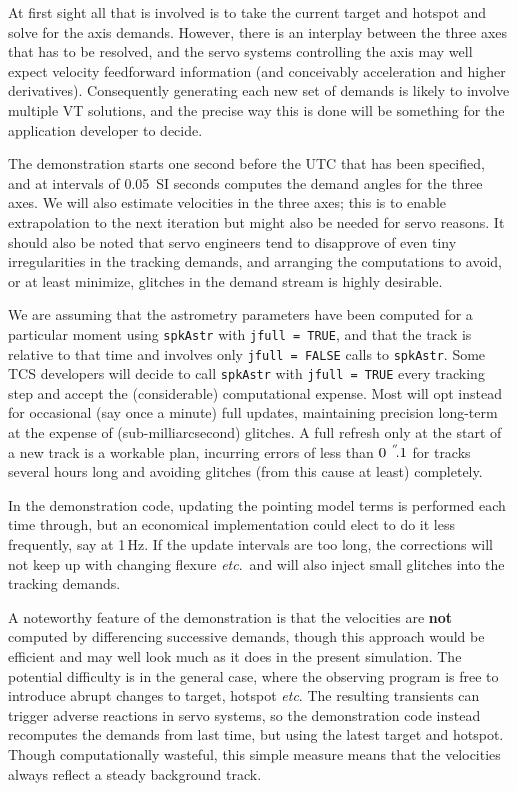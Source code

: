 \documentclass[11pt,fleqn,twoside,\paper]{article}
\renewcommand{\_}{{\tt\char'137}}     %
\newcommand{\arcseci}[1] {$#1\hspace{0.05em}$\raisebox{-0.5ex}
                         {$^{'\hspace{-0.1em}'\hspace{0.0em}}$}}
\newcommand{\arcsec}[2] {\arcseci{#1}$\hspace{-0.35em}.#2$}
\begin{document}
At first sight all that is
involved is to take the current target and hotspot
and solve for the axis demands.
However, there is an interplay between the three axes that has to be
resolved, and the servo systems controlling the axis may well expect
velocity feedforward information (and conceivably acceleration and
higher derivatives).  Consequently generating each new set of
demands is likely to involve multiple VT solutions, and the precise
way this is done will be something for the application developer to
decide.

The demonstration starts one second before the UTC that has
been specified, and at intervals of 0.05~SI seconds computes the
demand angles for the three axes.  We will also estimate velocities
in the three axes;  this is to enable extrapolation to the next
iteration but might also be needed for servo reasons.  It should also
be noted that servo engineers tend to disapprove of even tiny
irregularities in the tracking demands, and arranging the
computations to avoid, or at least minimize, glitches in the
demand stream is highly desirable.

We are assuming that the astrometry parameters have
been computed for a particular moment using {\tt spkAstr} with
{\tt jfull~=~TRUE}, and that the track is relative to that time and
involves only {\tt jfull~=~FALSE} calls to {\tt spkAstr}.
Some TCS developers will decide to call {\tt spkAstr} with
{\tt jfull~=~TRUE} every tracking step and accept the
(considerable)
computational expense.  Most will opt instead for
occasional (say once a minute) full updates, maintaining
precision long-term at the expense of (sub-milliarcsecond)
glitches.  A full refresh only at the start of a new track
is a workable plan, incurring errors of less than
\arcsec{0}{1} for tracks several hours long and avoiding
glitches (from this cause at least) completely.

In the demonstration code, updating the pointing model terms is
performed each time through, but an economical implementation
could elect to do it less frequently, say at 1\,Hz.  If
the update intervals are too long, the corrections will not keep
up with changing flexure {\it etc}.~and will also inject small
glitches into the tracking demands.

A noteworthy feature of the demonstration is that the velocities
are {\bf not} computed by differencing successive demands, though
this approach would be efficient and may well look much as it does
in the present simulation.  The potential difficulty is in the
general case, where the observing program is free to introduce
abrupt changes to target, hotspot {\it etc}.  The resulting
transients can trigger adverse reactions in servo systems, so the
demonstration code instead recomputes the demands from last time,
but using the latest target and hotspot.  Though
computationally wasteful, this simple measure means that the
velocities always reflect a steady background track.
\end{document}
